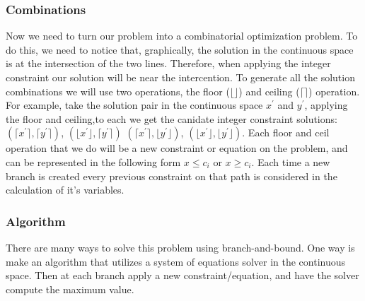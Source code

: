         \subsubsection{Combinations}
        Now we need to turn our problem into a combinatorial optimization problem.
        To do this, we need to notice that, graphically, the solution in the continuous space is at 
        the intersection of the two lines. Therefore, when applying the integer constraint our
        solution will be near the intercention. To generate all the solution combinations we will 
        use two operations, the floor ($\lfloor \rfloor$) and ceiling ($\lceil \rceil$) operation. 
        For example, take the solution pair in the continuous space $x^{'}$ and $y^{'}$,
        applying the floor and ceiling,to each we get the canidate integer constraint solutions:  
        $(\lceil x^{'} \rceil, \lceil y^{'} \rceil)$, $(\lfloor x^{'} \rfloor, \lceil y^{'} \rceil)$
        $(\lceil x^{'} \rceil, \lfloor y^{'} \rfloor)$, $(\lfloor x^{'} \rfloor, \lfloor y^{'} \rfloor)$.
        Each floor and ceil operation that we do will be a new constraint or equation on the problem,
        and can be represented in the following form $x \leq c_i$ or $x \geq c_i$. 
        Each time a new branch is created every previous constraint on that path is 
        considered in the calculation of it's variables.

        \subsubsection{Algorithm}
        There are many ways to solve this problem using branch-and-bound.
        One way is make an algorithm that utilizes a system of equations solver in the continuous space.
        Then at each branch apply a new constraint/equation, and have the solver compute the maximum value.
        